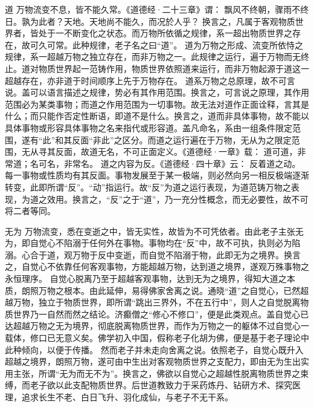 \documentclass[11pt]{article}
\begin{document}
  道
  万物流变不息，皆不能久常。《道德经·二十三章》谓：
  飘风不终朝，骤雨不终日。孰为此者？天地。天地尚不能久，而况於人乎？
  换言之，凡属于客观物质世界者，皆处于一不断变化之状态。而万物所依循之规律，系一超出物质世界之存在，故可久可常。此种规律，老子名之曰“道”。
  道为万物之形成、流变所依恃之规律，系一超越万物之独立存在，而非万物之一。此规律之运行，遍于万物而无终止。道对物质世界起一范铸作用，物质世界依照道来运行，而非万物起源于道这一超越存在，亦非道于时间顺序上先于万物存在。
  道系万物之总原理，故不可言说。盖可以语言描述之规律，势必有其作用范围。换言之，可言说之原理，其作用范围必为某类事物；而道之作用范围为一切事物。故无法对道作正面诠释，言其是什么；而只能作否定性断语，即道不是什么。换言之，道而非具体事物，故不能以具体事物或形容具体事物之名来指代或形容道。盖凡命名，系由一组条件限定范围，遂有“此”和其反面“非此”之区分。而道之运行遍在于万物，无从为之限定范围，无从寻其反面，故道无名，不可正面定义。《道德经·一章》载：
  道可道，非常道；名可名，非常名。
  道之内容为反。《道德经·四十章》云：
  反着道之动。
  每一事物或性质均有其反面。事物发展至于某一极端，则必然向另一相反极端逐渐转变，此即所谓“反”。“动”指运行。故“反”为道之运行表现，为道范铸万物之表现，为道之效用。换言之，“反”之于“道”，乃一充分性概念，而无必要性，故不可将二者等同。
  
  无为
  万物流变，悉在变逝之中，皆无实性，故皆为不可凭依者。由此老子主张无为，即自觉心不陷溺于任何外在事物。事物均在“反”中，故不可执，执则必为陷溺。心合于道，观万物于反中变逝，而自觉不陷溺于物，此即无为之境界。换言之，自觉心不依靠任何客观事物，方能超越万物，达到道之境界，遂观万殊事物之永恒理序。
  自觉心脱离乃至于超越客观事物，达到无为之境界，得知大道之本质，朗照万物之根本。由此延伸，易得佛家舍离之说。通晓“道”之自觉心，已然超越万物，独立于物质世界，即所谓“跳出三界外，不在五行中”，则人之自觉脱离物质世界乃一自然而然之结论。济癫僧之“修心不修口”，便是此类观点。盖自觉心已达超越万物之无为境界，彻底脱离物质世界，而作为万物之一的躯体不过自觉心一载体，修口已无意义矣。佛学初入中国，假称老子化胡为佛，便是基于老子理论中此种倾向，以便于传播。
  然而老子并未走向舍离之说。依照老子，自觉心既升入超越之境界，朗照万物，遂可由中生出对客观物质世界之支配力，即由无为生出实用主张，所谓“无为而无不为”。换言之，佛欲以自觉心之超越性脱离物质世界之束缚，而老子欲以此支配物质世界。后世道教致力于采药炼丹、钻研方术、探究医理，追求长生不老、白日飞升、羽化成仙，与老子不无干系。
  
\end{document}
